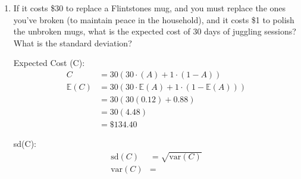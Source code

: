 \begin{enumerate}[label=(\alph*)]
        \pagebreak

        \item If it costs \$30 to replace a Flintstones mug, and you must replace the ones you've broken (to maintain peace in the household), and it costs \$1 to polish the unbroken mugs, what is the expected cost of 30 days of juggling sessions? What is the
        standard deviation?
        \\
        \begin{mdframed}
            Expected Cost (C): 
            \begin{align*}
                C               & = 30(30 \cdot (A) + 1 \cdot (1 - A))    \\
                \mathbb{E}(C)   & = 30(30 \cdot \mathbb{E}(A) + 1 \cdot (1 - \mathbb{E}(A)))    \\
                                & = 30(30(0.12) + 0.88) \\
                                & = 30(4.48)            \\
                                & = \boxed{\$134.40}
            \end{align*}

            sd(C):
            \begin{align*}
                \text{sd}(C)    & = \sqrt{\text{var}(C)}    \\
                \text{var}(C)   & = 
            \end{align*}
        \end{mdframed}
    \end{enumerate}

